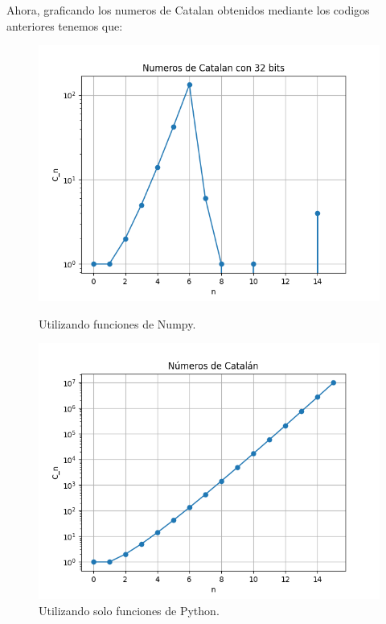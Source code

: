 \documentclass[../portafolio.tex]{subfiles}
\begin{document}
Ahora, graficando los numeros de Catalan obtenidos mediante los codigos anteriores tenemos que:

\begin{figure}[ht]
  \centering
  \begin{minipage}[b]{0.48\textwidth}
    \centering
    \includegraphics[width=\linewidth]{../img/Catalan_numpy32.png}
    \caption{Utilizando funciones de Numpy.}
    \label{fig:min1}
  \end{minipage}
  \hfill
  \begin{minipage}[b]{0.48\textwidth}
    \centering
    \includegraphics[width=\linewidth]{../img/Catalan_python.png}
    \caption{Utilizando solo funciones de Python.}
    \label{fig:min2}
  \end{minipage}
\end{figure}
\end{document}
